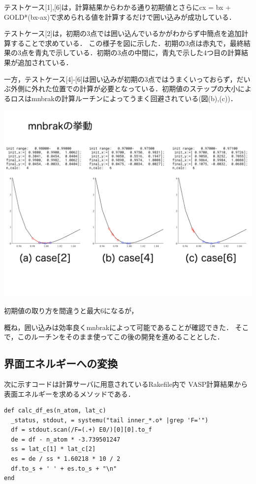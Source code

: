 テストケース{[}1{]},{[}6{]}は，計算結果からわかる通り初期値とさらにcx =
bx + GOLD*(bx-ax)で求められる値を計算するだけで囲い込みが成功している．

テストケース{[}2{]}は，初期の3点では囲い込んでいるかがわからず中簡点を追加計算することで求めている．
この様子を図に示した．初期の3点は赤丸で，最終結果の3点を青丸で示している．初期の3点の中間に，青丸で示した4つ目の計算結果が追加されている．

一方，テストケース{[}4{]}-{[}6{]}は囲い込みが初期の3点ではうまくいっておらず，だいぶ外側に外れた位置での計算が必要となっている．初期値のステップの大小によるロスはmnbrakの計算ルーチンによってうまく回避されている(図(b),(c))．
\begin{center}
\includegraphics[width=150mm]{../.././figs/thesis_006.jpeg}
\end{center}
初期値の取り方を間違うと最大6になるが，

\label{fig:}
概ね，囲い込みは効率良くmnbrakによって可能であることが確認できた．
そこで，このルーチンをそのまま使ってこの後の開発を進めることとした．

    \subsection{界面エネルギーへの変換}\label{ux754cux9762ux30a8ux30cdux30ebux30aeux30fcux3078ux306eux5909ux63db}

次に示すコードは計算サーバに用意されているRakefile内で
VASP計算結果から表面エネルギーを求めるメソッドである．

\begin{verbatim}
def calc_df_es(n_atom, lat_c)
  _status, stdout, = systemu("tail inner_*.o* |grep 'F='")
  df = stdout.scan(/F=(.+) E0/)[0][0].to_f
  de = df - n_atom * -3.739501247
  ss = lat_c[1] * lat_c[2]
  es = de / ss * 1.60218 * 10 / 2
  df.to_s + ' ' + es.to_s + "\n"
end
\end{verbatim}

